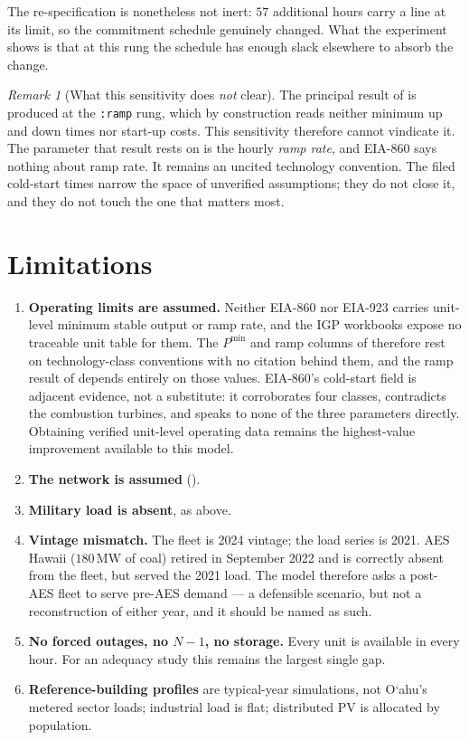 \documentclass[11pt,a4paper]{article}
\theoremstyle{definition}
\theoremstyle{plain}
\theoremstyle{remark}
\newtheorem{remark}[definition]{Remark}
\newcommand{\MW}{\,\mathrm{MW}}
\newcommand{\okina}{\textquoteleft}
\newcommand{\Oahu}{O\okina ahu}
\begin{document}
The re-specification is nonetheless not inert: $57$ additional hours carry a
line at its limit, so the commitment schedule genuinely changed. What the
experiment shows is that at this rung the schedule has enough slack elsewhere to
absorb the change.

\begin{remark}[What this sensitivity does \emph{not} clear]
\label{rem:notcleared}
The principal result of  is produced at the \texttt{:ramp}
rung, which by construction reads neither minimum up and down times nor start-up
costs. This sensitivity therefore cannot vindicate it. The parameter that result
rests on is the hourly \emph{ramp rate}, and EIA-860 says nothing about ramp
rate. It remains an uncited technology convention. The filed cold-start times
narrow the space of unverified assumptions; they do not close it, and they do
not touch the one that matters most.
\end{remark}

\section{Limitations}
\label{sec:limits}

\begin{enumerate}[leftmargin=1.4em,itemsep=2pt]
\item \textbf{Operating limits are assumed.} Neither EIA-860 nor EIA-923 carries
  unit-level minimum stable output or ramp rate, and the IGP workbooks expose no
  traceable unit table for them. The $P^{\min}$ and ramp columns of
   therefore rest on technology-class conventions with no
  citation behind them, and the ramp result of  depends
  entirely on those values. EIA-860's cold-start field is adjacent evidence, not
  a substitute: it corroborates four classes, contradicts the combustion
  turbines, and speaks to none of the three parameters directly. Obtaining
  verified unit-level operating data remains the highest-value improvement
  available to this model.
\item \textbf{The network is assumed} ().
\item \textbf{Military load is absent}, as above.
\item \textbf{Vintage mismatch.} The fleet is 2024 vintage; the load series is
  2021. AES Hawaii ($180\MW$ of coal) retired in September 2022 and is correctly
  absent from the fleet, but served the 2021 load. The model therefore asks a
  post-AES fleet to serve pre-AES demand --- a defensible scenario, but not a
  reconstruction of either year, and it should be named as such.
\item \textbf{No forced outages, no $N-1$, no storage.} Every unit is available
  in every hour. For an adequacy study this remains the largest single gap.
\item \textbf{Reference-building profiles} are typical-year simulations, not
  \Oahu{}'s metered sector loads; industrial load is flat; distributed PV is
  allocated by population.
\end{enumerate}
\end{document}
